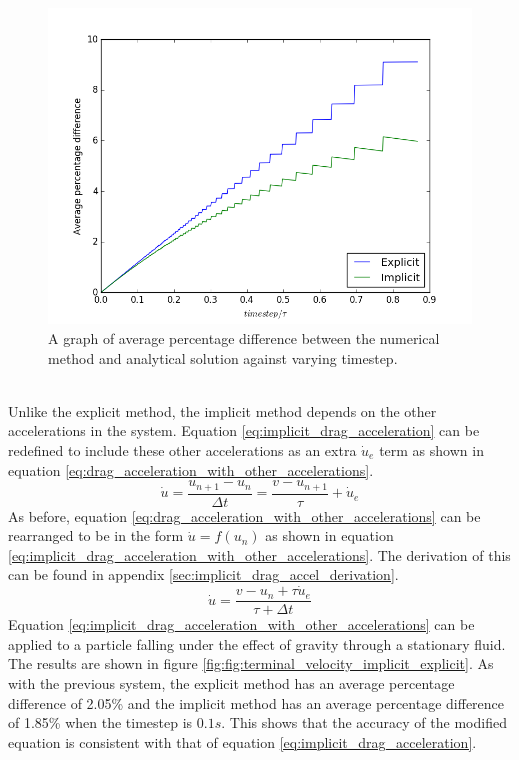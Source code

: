 \documentclass[10pt,a4paper,titlepage]{report}
\begin{document}
\begin{figure}[!htb]
\centering
\includegraphics[scale=0.75]{figures/AveragePercentageDifferenceAgainstTimestep.png}
\caption{A graph of average percentage difference between the numerical method and analytical solution against varying timestep.}
\label{fig:avg_percent_diff_against_timestep}
\end{figure}
\\Unlike the explicit method, the implicit method depends on the other accelerations in the system. Equation \ref{eq:implicit_drag_acceleration} can be redefined to include these other accelerations as an extra $\dot{u}_{e}$ term as shown in equation \ref{eq:drag_acceleration_with_other_accelerations}.
\begin{equation}
\dot{u} = \dfrac{u_{n+1} - u_{n}}{\Delta t} = \dfrac{v - u_{n+1}}{\tau} + \dot{u}_{e}
\label{eq:drag_acceleration_with_other_accelerations}
\end{equation}
As before, equation \ref{eq:drag_acceleration_with_other_accelerations} can be rearranged to be in the form $\dot{u} = f(u_{n})$ as shown in equation \ref{eq:implicit_drag_acceleration_with_other_accelerations}. The derivation of this can be found in appendix \ref{sec:implicit_drag_accel_derivation}.
\begin{equation}
\dot{u} = \dfrac{v - u_{n} + \tau \dot{u}_{e}}{\tau + \Delta t}
\label{eq:implicit_drag_acceleration_with_other_accelerations}
\end{equation}
Equation \ref{eq:implicit_drag_acceleration_with_other_accelerations} can be applied to a particle falling under the effect of gravity through a stationary fluid. The results are shown in figure \ref{fig:fig:terminal_velocity_implicit_explicit}. As with the previous system, the explicit method has an average percentage difference of 2.05\% and the implicit method has an average percentage difference of 1.85\% when the timestep is $0.1 s$. This shows that the accuracy of the modified equation is consistent with that of equation \ref{eq:implicit_drag_acceleration}.
\end{document}
